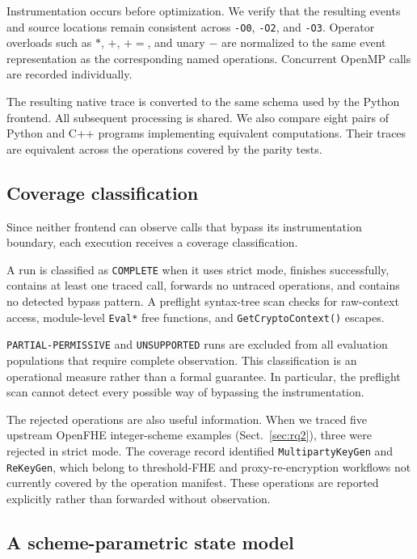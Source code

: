 \documentclass[pdflatex,sn-basic,Numbered,iicol]{sn-jnl}
\begin{document}
Instrumentation occurs before optimization. We verify that the resulting
events and source locations remain consistent across \texttt{-O0},
\texttt{-O2}, and \texttt{-O3}. Operator overloads such as $*$, $+$, $+{=}$,
and unary $-$ are normalized to the same event representation as the
corresponding named operations. Concurrent OpenMP calls are recorded
individually.

The resulting native trace is converted to the same schema used by the Python
frontend. All subsequent processing is shared. We also compare eight pairs of
Python and C++ programs implementing equivalent computations. Their traces are
equivalent across the operations covered by the parity tests.

\subsection{Coverage classification}
\label{sec:coverage}

Since neither frontend can observe calls that bypass its instrumentation
boundary, each execution receives a coverage classification.

A run is classified as \texttt{COMPLETE} when it uses strict mode, finishes
successfully, contains at least one traced call, forwards no untraced
operations, and contains no detected bypass pattern. A preflight syntax-tree
scan checks for raw-context access, module-level \texttt{Eval*} free
functions, and \texttt{GetCryptoContext()} escapes.

\texttt{PARTIAL-PERMISSIVE} and \texttt{UNSUPPORTED} runs are excluded from
all evaluation populations that require complete observation. This
classification is an operational measure rather than a formal guarantee. In
particular, the preflight scan cannot detect every possible way of bypassing
the instrumentation.

The rejected operations are also useful information. When we traced five
upstream OpenFHE integer-scheme examples (Sect.~\ref{sec:rq2}), three were
rejected in strict mode. The coverage record identified
\texttt{MultipartyKeyGen} and \texttt{ReKeyGen}, which belong to
threshold-FHE and proxy-re-encryption workflows not currently covered by the
operation manifest. These operations are reported explicitly rather than
forwarded without observation.

\subsection{A scheme-parametric state model}
\label{sec:scheme}
\end{document}
